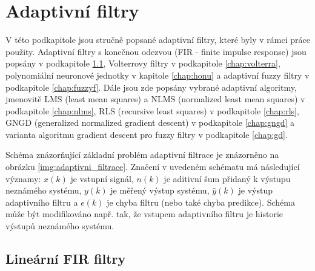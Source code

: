 \section{Adaptivní filtry}\label{chap:af}
V této podkapitole jsou stručně popsané adaptivní filtry, které byly v rámci práce použity. Adaptivní filtry s konečnou odezvou (FIR - finite impulse response) jsou popsány v podkapitole \ref{chap:fir}, Volterrovy filtry v podkapitole \ref{chap:volterra}, polynomiální neuronové jednotky v kapitole \ref{chap:honu} a adaptivní fuzzy filtry v podkapitole   \ref{chap:fuzzyf}. Dále jsou zde popsány vybrané adaptivní algoritmy, jmenovitě LMS (least mean squares) a NLMS (normalized least mean squares) v podkapitole \ref{chap:nlms}, RLS (recursive least squares) v podkapitole  \ref{chap:rls}, GNGD (generalized normalized gradient descent) v podkapitole   \ref{chap:gngd} a varianta algoritmu gradient descent pro fuzzy filtry v podkapitole  \ref{chap:gd}.
\par 
Schéma znázorňující základní problém adaptivní filtrace je znázorněno na obrázku \ref{img:adaptivni_filtrace}. Značení v uvedeném schématu má následující významy: $x(k)$ je vstupní signál, $n(k)$ je aditivní šum přidaný k výstupu neznámého systému, $y(k)$ je měřený výstup systému, $\hat{y}(k)$ je výstup adaptivního filtru a $e(k)$ je chyba filtru (nebo také chyba predikce). Schéma může být modifikováno např. tak, že vstupem adaptivního filtru je historie výstupů neznámého systému.

\subsection{Lineární FIR filtry}\label{chap:fir}

